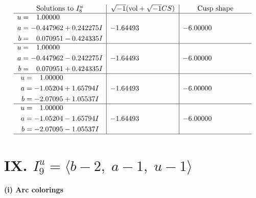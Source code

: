 \documentclass[1p]{elsarticle_modified}
\theoremstyle{definition}
\newcommand{\I}{\sqrt{-1}}
\begin{document}
$$\begin{array}{c|c|c}  
\text{Solutions to }I^u_{8}& \I (\text{vol} + \sqrt{-1}CS) & \text{Cusp shape}\\
 \hline 
\begin{aligned}
u &= \phantom{-}1.00000\phantom{ +0.000000I} \\
a &= -0.447962 + 0.242275 I \\
b &= \phantom{-}0.070951 - 0.424335 I\end{aligned}
 & -1.64493\phantom{ +0.000000I} & -6.00000\phantom{ +0.000000I} \\ \hline\begin{aligned}
u &= \phantom{-}1.00000\phantom{ +0.000000I} \\
a &= -0.447962 - 0.242275 I \\
b &= \phantom{-}0.070951 + 0.424335 I\end{aligned}
 & -1.64493\phantom{ +0.000000I} & -6.00000\phantom{ +0.000000I} \\ \hline\begin{aligned}
u &= \phantom{-}1.00000\phantom{ +0.000000I} \\
a &= -1.05204 + 1.65794 I \\
b &= -2.07095 + 1.05537 I\end{aligned}
 & -1.64493\phantom{ +0.000000I} & -6.00000\phantom{ +0.000000I} \\ \hline\begin{aligned}
u &= \phantom{-}1.00000\phantom{ +0.000000I} \\
a &= -1.05204 - 1.65794 I \\
b &= -2.07095 - 1.05537 I\end{aligned}
 & -1.64493\phantom{ +0.000000I} & -6.00000\phantom{ +0.000000I}\\
 \hline 
 \end{array}$$\newpage\newpage\renewcommand{\arraystretch}{1}
\centering \section*{IX. $I^u_{9}= \langle b-2,\;a-1,\;u-1 \rangle$}
\flushleft \textbf{(i) Arc colorings}\\
\end{document}
